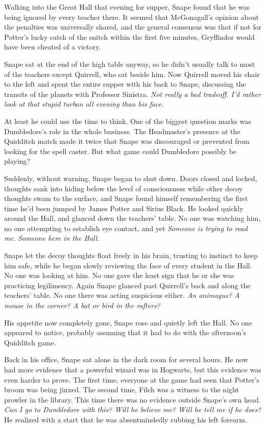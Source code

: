 Walking into the Great Hall that evening for supper, Snape found that he was being ignored by every teacher there. It seemed that McGonagall's opinion about the penalties was universally shared, and the general consensus was that if not for Potter's lucky catch of the snitch within the first five minutes, Gryffindor would have been cheated of a victory.

Snape sat at the end of the high table anyway, so he didn't usually talk to most of the teachers except Quirrell, who sat beside him. Now Quirrell moved his chair to the left and spent the entire supper with his back to Snape, discussing the transits of the planets with Professor Sinistra. \emph{Not really a bad tradeoff. I'd rather look at that stupid turban all evening than his face.}

At least he could use the time to think. One of the biggest question marks was Dumbledore's role in the whole business. The Headmaster's presence at the Quidditch match made it twice that Snape was discouraged or prevented from looking for the spell caster. But what game could Dumbledore possibly be playing?

Suddenly, without warning, Snape began to shut down. Doors closed and locked, thoughts sank into hiding below the level of consciousness while other decoy thoughts swam to the surface, and Snape found himself remembering the first time he'd been jumped by James Potter and Sirius Black. He looked quickly around the Hall, and glanced down the teachers' table. No one was watching him, no one attempting to establish eye contact, and yet{\el} \emph{Someone is trying to read me. Someone here in the Hall.}

Snape let the decoy thoughts float freely in his brain, trusting to instinct to keep him safe, while he began slowly reviewing the face of every student in the Hall. No one was looking at him. No one gave the least sign that he or she was practicing legilimency. Again Snape glanced past Quirrell's back and along the teachers' table. No one there was acting suspicious either. \emph{An animagus? A mouse in the corner? A bat or bird in the rafters?}

His appetite now completely gone, Snape rose and quietly left the Hall. No one appeared to notice, probably assuming that it had to do with the afternoon's Quidditch game.

Back in his office, Snape sat alone in the dark room for several hours. He now had more evidence that a powerful wizard was in Hogwarts, but this evidence was even harder to prove. The first time, everyone at the game had seen that Potter's broom was being jinxed. The second time, Filch was a witness to the night prowler in the library. This time there was no evidence outside Snape's own head. \emph{Can I go to Dumbledore with this? Will he believe me? Will he tell me if he does?} He realized with a start that he was absentmindedly rubbing his left forearm.

